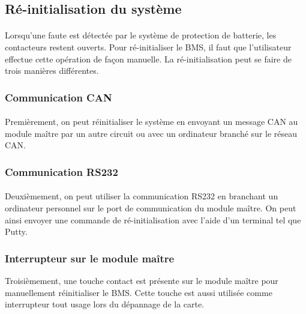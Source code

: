 \subsection{Ré-initialisation du système}

	\paragraph*{}
	Lorsqu'une faute est détectée par le système de protection de batterie, les contacteurs restent ouverts. Pour ré-initialiser le BMS, il faut que l'utilisateur effectue cette opération de façon manuelle. La ré-initialisation peut se faire de trois manières différentes.
		
	\subsubsection{Communication CAN}
		\paragraph*{}
		Premièrement, on peut réinitialiser le système en envoyant un message CAN au module maître par un autre circuit ou avec un ordinateur branché sur le réseau CAN. 

	\subsubsection{Communication RS232}
		\paragraph*{}	
		Deuxièmement, on peut utiliser la communication RS232 en branchant un ordinateur personnel sur le port de communication du module maître. On peut ainsi envoyer une commande de ré-initialisation avec l'aide d'un terminal tel que Putty.
				
	\subsubsection{Interrupteur sur le module maître}
		Troisièmement, une touche contact est présente sur le module maître pour manuellement réinitialiser le BMS. Cette touche est aussi utilisée comme interrupteur tout usage lors du dépannage de la carte.